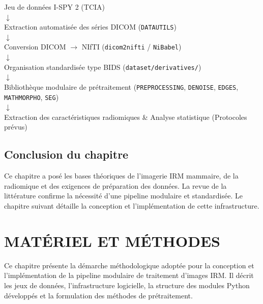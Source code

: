\documentclass[12pt,a4paper]{report}
\begin{document}
    \begin{center}
    \small
    \begin{tcolorbox}[colframe=primaryblue,colback=lightgrey,halign=center]
    Jeu de données I-SPY 2 (TCIA)\\[2pt]
    $\downarrow$\\[2pt]
    Extraction automatisée des séries DICOM (\texttt{DATAUTILS})\\[2pt]
    $\downarrow$\\[2pt]
    Conversion DICOM $\rightarrow$ NIfTI (\texttt{dicom2nifti} / \texttt{NiBabel})\\[2pt]
    $\downarrow$\\[2pt]
    Organisation standardisée type BIDS (\texttt{dataset/derivatives/})\\[2pt]
    $\downarrow$\\[2pt]
    Bibliothèque modulaire de prétraitement (\texttt{PREPROCESSING}, \texttt{DENOISE}, \texttt{EDGES}, \texttt{MATHMORPHO}, \texttt{SEG})\\[2pt]
    $\downarrow$\\[2pt]
    Extraction des caractéristiques radiomiques \& Analyse statistique (Protocoles prévus)
    \end{tcolorbox}
    \end{center}

    \section*{Conclusion du chapitre}
    Ce chapitre a posé les bases théoriques de l'imagerie IRM mammaire, de la radiomique et des exigences de préparation des données. La revue de la littérature confirme la nécessité d'une pipeline modulaire et standardisée. Le chapitre suivant détaille la conception et l'implémentation de cette infrastructure.

    \chapter{MATÉRIEL ET MÉTHODES}
    
    Ce chapitre présente la démarche méthodologique adoptée pour la conception et l'implémentation de la pipeline modulaire de traitement d'images IRM. Il décrit les jeux de données, l'infrastructure logicielle, la structure des modules Python développés et la formulation des méthodes de prétraitement.
\end{document}
